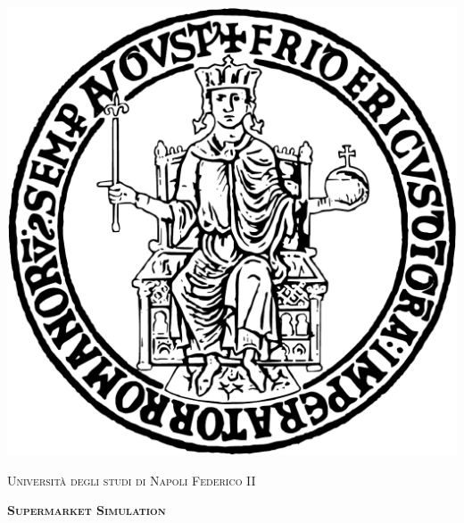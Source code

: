 \documentclass[a4paper, 12pt]{article}
\begin{document}

\begin{titlepage}

    \begin{center}
        \includegraphics[scale=0.4]{Images/logo-federico-II.pdf} 
    \end{center}

    \thispagestyle{empty}

    \center

    \textsc{\large Università degli studi di Napoli Federico II}

    \vspace{0.5in}

    \noindent\makebox[\linewidth]{\rule{\linewidth}{1.2pt}}
    \textsc{ \textbf{\large Supermarket Simulation }}
    \noindent\makebox[\linewidth]{\rule{\linewidth}{1.2pt}}

    \vspace{0.5in}


\end{titlepage}
\end{document}
